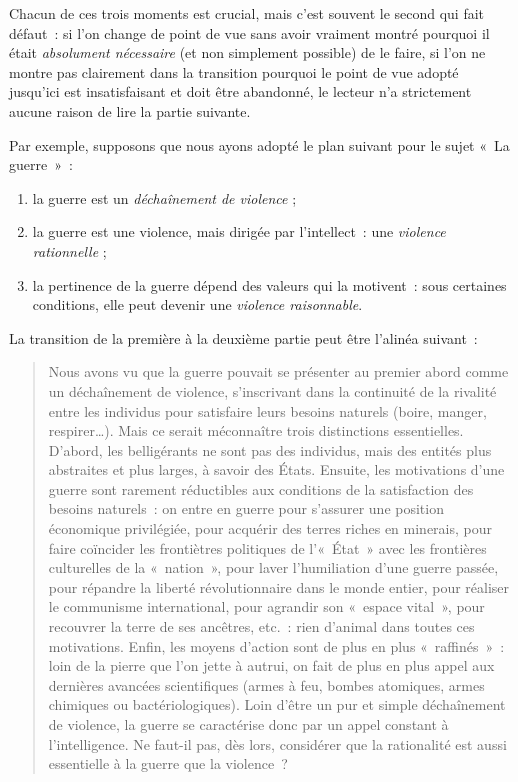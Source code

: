 \documentclass[a4paper,12pt]{report}
\begin{document}
Chacun de ces trois moments est crucial, mais c'est souvent le second
qui fait défaut : si l'on change de point de vue sans avoir vraiment
montré pourquoi il était \emph{absolument nécessaire} (et non simplement
possible) de le faire, si l'on ne montre pas clairement dans la
transition pourquoi le point de vue adopté jusqu'ici est insatisfaisant
et doit être abandonné, le lecteur n'a strictement aucune raison de lire
la partie suivante.

Par exemple, supposons que nous ayons adopté le plan suivant pour le
sujet « La guerre » :

\begin{enumerate}
\item la guerre est un \emph{déchaînement de violence} ;

\item la guerre est une violence, mais dirigée par l'intellect : une
\emph{violence rationnelle} ;

\item la pertinence de la guerre dépend des valeurs qui la motivent : sous
certaines conditions, elle peut devenir une \emph{violence raisonnable}.
\end{enumerate}

\noindent La transition de la première à la deuxième partie peut être
l'alinéa suivant :

\begin{quote}
Nous avons vu que la guerre pouvait se présenter au premier abord
comme un déchaînement de violence, s'inscrivant dans la continuité de
la rivalité entre les individus pour satisfaire leurs besoins naturels
(boire, manger, respirer\ldots{}). Mais ce serait méconnaître trois
distinctions essentielles. D'abord, les belligérants ne sont pas des
individus, mais des entités plus abstraites et plus larges, à savoir
des États. Ensuite, les motivations d'une guerre sont rarement
réductibles aux conditions de la satisfaction des besoins naturels :
on entre en guerre pour s'assurer une position économique privilégiée,
pour acquérir des terres riches en minerais, pour faire coïncider les
frontiètres politiques de l'« État » avec les frontières culturelles
de la « nation », pour laver l'humiliation d'une guerre passée, pour
répandre la liberté révolutionnaire dans le monde entier, pour
réaliser le communisme international, pour agrandir son « espace
vital », pour recouvrer la terre de ses ancêtres, etc. : rien d'animal
dans toutes ces motivations. Enfin, les moyens d'action sont de plus
en plus « raffinés » : loin de la pierre que l'on jette à autrui, on
fait de plus en plus appel aux dernières avancées scientifiques (armes
à feu, bombes atomiques, armes chimiques ou bactériologiques). Loin
d'être un pur et simple déchaînement de violence, la guerre se
caractérise donc par un appel constant à l'intelligence. Ne faut-il
pas, dès lors, considérer que la rationalité est aussi essentielle à
la guerre que la violence ?
\end{quote}
\end{document}
